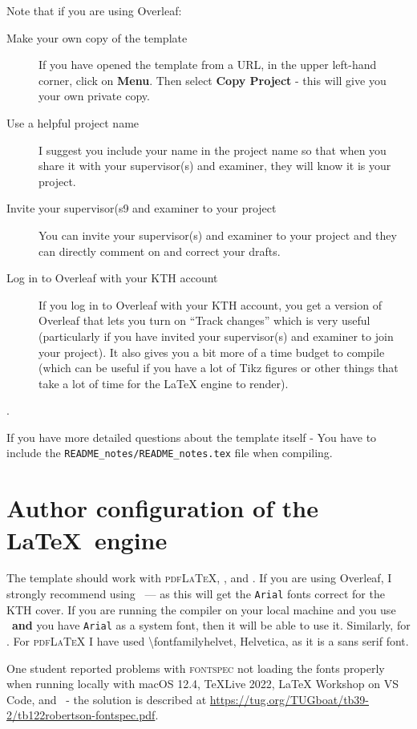 \documentclass[examplethesis.tex]{subfiles}
\begin{document}
Note that if you are using Overleaf:
\begin{description}
    \item[Make your own copy of the template]
    If you have opened the template from a URL, in the upper left-hand corner, click on \textbf{Menu}. Then select \textbf{Copy Project} - this will give you your own private copy.

\item[Use a helpful project name]
    I suggest you include your name in the project name so that when you share it with your supervisor(s) and examiner, they will know it is your project. 
\item[Invite your supervisor(s9 and examiner to your project] 
    You can invite your supervisor(s) and examiner to your project and they can directly comment on and correct your drafts.
\item[Log in to Overleaf with your KTH account] 
If you log in to Overleaf with your KTH account, you get a version of Overleaf that lets you turn on ``Track changes'' which is very useful (particularly if you have invited your supervisor(s) and examiner to join your project). It also gives you a bit more of a time budget to compile (which can be useful if you have a lot of Tikz figures or other things that take a lot of time for the LaTeX engine to render).
\end{description}

.


If you have more detailed questions about the template itself - 
{You have to include the \texttt{README\_notes/README\_notes.tex} file when compiling.}

\section{Author configuration of the \LaTeX\  engine}
\label{sec:latexEngine}
The template should work with \textsc{pdfLaTeX}, \XeLaTeX, and \LuaLaTeX.  If you are using Overleaf, I strongly recommend using \XeLaTeX\ ---  as this will get the \texttt{Arial} fonts correct for the KTH cover. If you are running the compiler on your local machine and you use \XeLaTeX\  \textbf{and} you have \texttt{Arial} as a system font, then it will be able to use it. Similarly, for \LuaLaTeX. For \textsc{pdfLaTeX} I have used \textbackslash fontfamily{helvet}, \ie Helvetica, as it is a sans serif font.

One student reported problems with \textsc{fontspec} not loading the fonts properly when running locally with macOS 12.4, TeXLive 2022, LaTeX Workshop on VS Code, and \XeLaTeX\  - the solution is described at \url{https://tug.org/TUGboat/tb39-2/tb122robertson-fontspec.pdf}.
\end{document}
